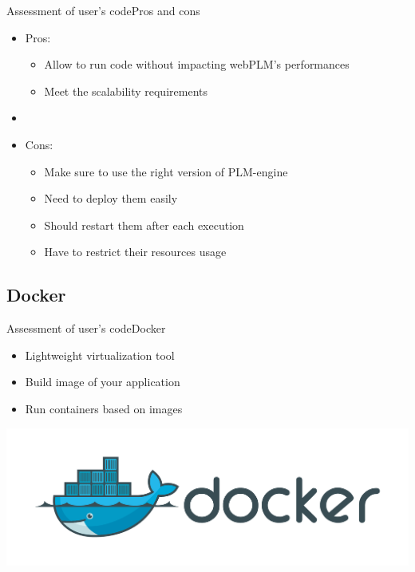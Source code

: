 \documentclass{beamer}
\begin{document}
\begin{frame}{Assessment of user's code}{Pros and cons}
  \begin{itemize}
  \item {
    Pros:
    \begin{itemize}
    \item Allow to run code without impacting webPLM's performances
    \item Meet the scalability requirements
    \end{itemize}
    \pause
  }
  \item[~]
  \item {
    Cons:
    \begin{itemize}
    \item Make sure to use the right version of PLM-engine
    \item Need to deploy them easily
    \item Should restart them after each execution
    \item Have to restrict their resources usage
    \end{itemize}
  }
  \end{itemize}
\end{frame}

\subsection{Docker}

\begin{frame}{Assessment of user's code}{Docker}
  \begin{itemize}
  \item {
    Lightweight virtualization tool
  }
  \item {
    Build image of your application
  }
  \item {
    Run containers based on images
  }
  \end{itemize}
  \begin{center}
    \includegraphics[scale=0.2]{img/docker-logo.png}
  \end{center}
\end{frame}
\end{document}
